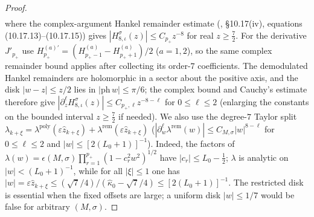\documentclass[11pt]{article}
\theoremstyle{definition}
\theoremstyle{remark}
\renewcommand{\_}{\oldunderscore\penalty0\hskip0pt\relax}
\begin{document}
\begin{proof}
\begin{equation}
\begin{gathered}
  \end{gathered}
\end{equation}
where the complex-argument Hankel remainder estimate (\cite{DLMF}, \S10.17(iv), equations (10.17.13)--(10.17.15)) gives
  $|H_{8,\iota}^\sigma(z)|\le C_{p_+}z^{-8}$ for real $z\ge\frac72$. For the derivative $J'_{p_+}$ use
  $H_{p_+}^{(a)\prime}=(H_{p_+-1}^{(a)}-H_{p_++1}^{(a)})/2$ ($a=1,2$), so the same complex remainder bound applies after
  collecting its order-$7$ coefficients. The demodulated Hankel remainders are holomorphic in a sector about the positive axis,
  and the disk $|w-z|\le z/2$ lies in $|\mathrm{ph}\,w|\le\pi/6$; the complex bound and Cauchy's estimate therefore give
  $|\partial_z^\ell H_{8,\iota}^\sigma(z)|\le C_{p_+,\ell}z^{-8-\ell}$ for $0\le\ell\le2$ (enlarging the constants on the bounded
  interval $z\ge\frac72$ if needed). We also use the degree-$7$ Taylor split
  $\lambda_{k+\xi}=\lambda^{\mathrm{poly}}(\varepsilon\hat{z}_{k+\xi})+\lambda^{\mathrm{rem}}(\varepsilon\hat{z}_{k+\xi})$
  ($|\partial_w^\ell\lambda^{\mathrm{rem}}(w)|\le C_{M,\sigma}|w|^{8-\ell}$ for $0\le\ell\le2$ and $|w|\le[2(L_0+1)]^{-1}$).
  Indeed, the factors of $\lambda(w)=\epsilon(M,\sigma)\prod_{r=1}^{p_+}(1-c_r^2w^2)^{1/2}$ have $|c_r|\le L_0-\frac12$;
  $\lambda$ is analytic on $|w|<(L_0+1)^{-1}$, while for all $|\xi|\le1$ one has
  $|w|=\varepsilon\hat{z}_{k+\xi}\le(\sqrt7/4)/(\hat{\kappa}_0-\sqrt7/4)\le[2(L_0+1)]^{-1}$. The restricted disk is essential
  when the fixed offsets are large; a uniform disk $|w|\le1/7$ would be false for arbitrary $(M,\sigma)$.


\end{proof}
\end{document}
